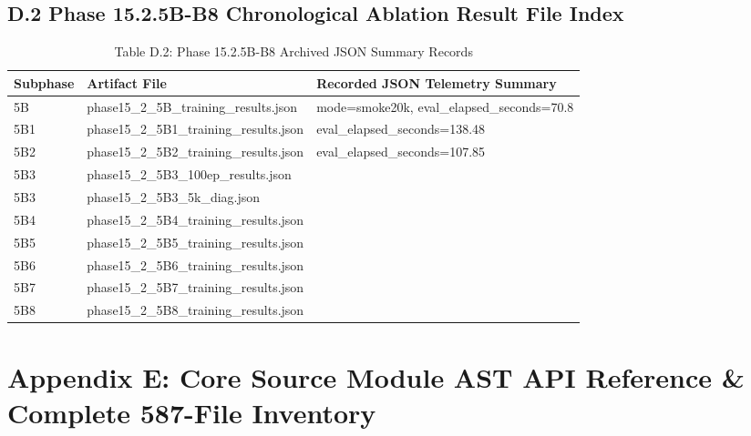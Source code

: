 \documentclass[11pt,a4paper,oneside]{book}
\begin{document}
\section{D.2 Phase 15.2.5B-B8 Chronological Ablation Result File Index}
\begin{longtable}{l l l}\caption{Table D.2: Phase 15.2.5B-B8 Archived JSON Summary Records}\\\toprule
Subphase & Artifact File & Recorded JSON Telemetry Summary \\ \midrule \endhead
5B & phase15\_2\_5B\_training\_results.json & mode=smoke20k, eval\_elapsed\_seconds=70.8 \\
5B1 & phase15\_2\_5B1\_training\_results.json & eval\_elapsed\_seconds=138.48 \\
5B2 & phase15\_2\_5B2\_training\_results.json & eval\_elapsed\_seconds=107.85 \\
5B3 & phase15\_2\_5B3\_100ep\_results.json &  \\
5B3 & phase15\_2\_5B3\_5k\_diag.json &  \\
5B4 & phase15\_2\_5B4\_training\_results.json &  \\
5B5 & phase15\_2\_5B5\_training\_results.json &  \\
5B6 & phase15\_2\_5B6\_training\_results.json &  \\
5B7 & phase15\_2\_5B7\_training\_results.json &  \\
5B8 & phase15\_2\_5B8\_training\_results.json &  \\
\bottomrule \end{longtable}
\chapter{Appendix E: Core Source Module AST API Reference \& Complete 587-File Inventory}
\end{document}
